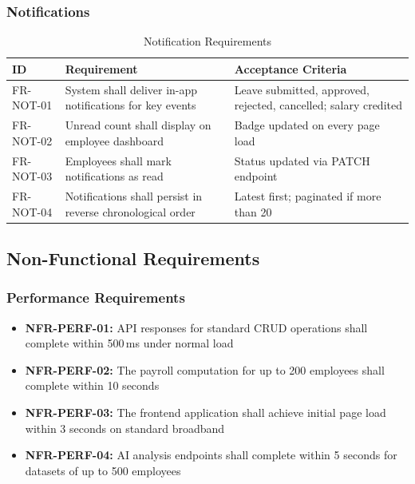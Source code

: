 \documentclass[12pt,a4paper]{report}
\begin{document}
\subsubsection{Notifications}

\begin{table}[H]
\centering
\caption{Notification Requirements}
\label{tab:notif_req}
\begin{tabular}{|p{2.2cm}|p{5cm}|p{5cm}|}
\hline
\textbf{ID} & \textbf{Requirement} & \textbf{Acceptance Criteria} \\
\hline
FR-NOT-01 & System shall deliver in-app notifications for key events & Leave submitted, approved, rejected, cancelled; salary credited \\
\hline
FR-NOT-02 & Unread count shall display on employee dashboard & Badge updated on every page load \\
\hline
FR-NOT-03 & Employees shall mark notifications as read & Status updated via PATCH endpoint \\
\hline
FR-NOT-04 & Notifications shall persist in reverse chronological order & Latest first; paginated if more than 20 \\
\hline
\end{tabular}
\end{table}

\subsection{Non-Functional Requirements}

\subsubsection{Performance Requirements}
\begin{itemize}
    \item \textbf{NFR-PERF-01:} API responses for standard CRUD operations shall complete within 500\,ms under normal load
    \item \textbf{NFR-PERF-02:} The payroll computation for up to 200 employees shall complete within 10 seconds
    \item \textbf{NFR-PERF-03:} The frontend application shall achieve initial page load within 3 seconds on standard broadband
    \item \textbf{NFR-PERF-04:} AI analysis endpoints shall complete within 5 seconds for datasets of up to 500 employees
\end{itemize}
\end{document}

